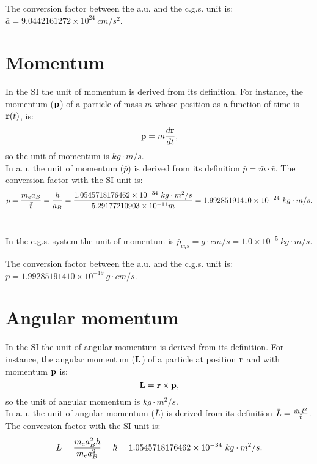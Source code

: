 \documentclass[12pt,a4paper]{article}
\def\hbarf{1.0545718176462\times 10^{-34}}
\def\barl{5.29177210903\times 10^{-11}}
\def\barp{1.99285191410\times 10^{-24}}
\def\ptop{1.0\times 10^{-5}}
\def\baracgs{9.0442161272\times 10^{24}}
\def\barpcgs{1.99285191410\times 10^{-19}}
\begin{document}
{\color{green} The conversion factor between the a.u. and the c.g.s. unit is:
$\bar a=\baracgs\ cm/s^2$.
\\
}

\newpage
\section{\color{coral}Momentum}
In the SI the unit of momentum is derived from its definition.
For instance, the momentum (${\bf p}$) of a particle of mass $m$ whose
position as a function of time is ${\bf r}(t)$, is:
\begin{equation}
{\bf p}=m {d{\bf r} \over dt},
\end{equation} 
so the unit of momentum is $kg\cdot m/s$.
\\

{\color{web-blue} In a.u. the unit of momentum ($\bar p$) is derived 
from its definition $\bar p = \bar m \cdot \bar v$. 
The conversion factor with the SI unit is:
\begin{equation}
\bar p = {m_e a_B \over \bar t}= {\hbar \over a_B} =
{\hbarf\ kg\cdot m^2/s \over \barl m}=\barp\ kg\cdot m/s.
\end{equation}
\\ }

{\color{orange} In the c.g.s. system the unit of momentum is 
$\bar p_{cgs}=g\cdot cm/s = \ptop\ kg\cdot m/s$.
\\
}

{\color{green} The conversion factor between the a.u. and the c.g.s. unit is:
$\bar p=\barpcgs\ g\cdot cm/s$.
\\
}

\newpage
\section{\color{coral}Angular momentum}
In the SI the unit of angular momentum is derived from its
definition. For instance, the angular momentum (${\bf L}$) 
of a particle at position ${\bf r}$ and with momentum ${\bf p}$ is:
\begin{equation}
{\bf L}= {{\bf r} \times {\bf p}},
\end{equation} 
so the unit of angular momentum is $kg\cdot m^2/s$.
\\

{\color{web-blue} In a.u. the unit of angular momentum ($\bar L$) is derived 
from its definition
$\bar L = {\bar m \cdot \bar l^2 \over \bar t}$. 
The conversion factor
with the SI unit is:
\begin{equation}
\bar L={m_e a_B^2 \hbar \over m_e a_B^2}=\hbar=
\hbarf\ kg\cdot m^2/s.
\end{equation}
\\
}
\end{document}
